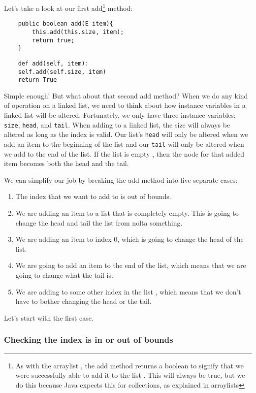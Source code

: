Let's take a look at our first add\footnote{As with the arraylist , the add method returns a boolean to signify that we were successfully able to add it to the list . This will always be true, but we do this because Java expects this for collections, as explained in arraylists } method:

\begin{verbatim}
	public boolean add(E item){
		this.add(this.size, item);
		return true;
	}
\end{verbatim}

\begin{verbatim}
	def add(self, item):
	self.add(self.size, item)
	return True
\end{verbatim}

Simple enough!  But what about that second add method?
When we do any kind of operation on a linked list, we need to think about how instance variables in a linked list will be altered. 
Fortunately, we only have three instance variables: \texttt{size}, \texttt{head}, and \texttt{tail}.
When adding to a linked list, the size will always be altered as long as the index is valid.
Our list's \texttt{head} will only be altered when we add an item to the beginning of the list and our \texttt{tail} will only be altered when we add to the end of the list.  If the list is empty , then the node for that added item becomes both the head and the tail.



We can simplify our job by breaking the add method into five separate cases:
\begin{enumerate}
	\item The index that we want to add to is out of bounds.
	\item We are adding an item to a list that is completely empty. This is going to change the head and tail the list from nolta something. 
	\item We are adding an item to index 0, which is going to change the head of the list.
	\item We are going to add an item to the end of the list, which means that we are going to change what the tail is.
	\item We are adding to some other index in the list , which means that we don't have to bother changing the head or the tail.
\end{enumerate}


Let's start with the first case.

\subsubsection{Checking the index is in or out of bounds}

